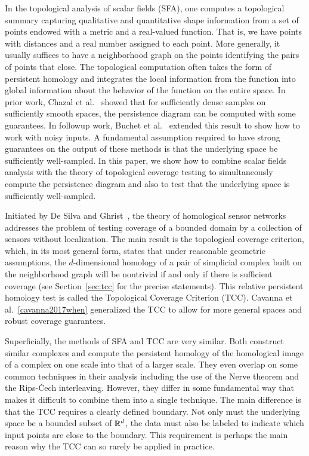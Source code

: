
In the topological analysis of scalar fields (SFA), one computes a topological summary capturing qualitative and quantitative shape information from a set of points endowed with a metric and a real-valued function.
That is, we have points with distances and a real number assigned to each point.
More generally, it usually suffices to have a neighborhood graph on the points identifying the pairs of points that close.
The topological computation often takes the form of persistent homology and integrates the local information from the function into global information about the behavior of the function on the entire space.
In prior work, Chazal et al.~\cite{XXX} showed that for sufficiently dense samples on sufficiently smooth spaces, the persistence diagram can be computed with some guarantees.
In followup work, Buchet et al.~\cite{XXX} extended this result to show how to work with noisy inputs.
A fundamental assumption required to have strong guarantees on the output of these methods is that the underlying space be sufficiently well-sampled.
In this paper, we show how to combine scalar fields analysis with the theory of topological coverage testing to simultaneously compute the persistence diagram and also to test that the underlying space is sufficiently well-sampled.

Initiated by De Silva and Ghrist~\cite{XXX,XXX,XXX}, the theory of homological sensor networks addresses the problem of testing coverage of a bounded domain by a collection of sensors without localization.
The main result is the topological coverage criterion, which, in its most general form, states that under reasonable geometric assumptions, the $d$-dimensional homology of a pair of simplicial complex built on the neighborhood graph will be nontrivial if and only if there is sufficient coverage (see Section~\ref{sec:tcc} for the precise statements).
This relative persistent homology test is called the Topological Coverage Criterion (TCC).
Cavanna et al.~\ref{cavanna2017when} generalized the TCC to allow for more general spaces and robust coverage guarantees.

Superficially, the methods of SFA and TCC are very similar.
Both construct similar complexes and compute the persistent homology of the homological image of a complex on one scale into that of a larger scale.
They even overlap on some common techniques in their analysis including the use of the Nerve theorem and the Rips-\v{C}ech interleaving.
However, they differ in some fundamental way that makes it difficult to combine them into a single technique.
The main difference is that the TCC requires a clearly defined boundary.
Not only must the underlying space be a bounded subset of $\mathbb{R}^d$, the data must also be labeled to indicate which input points are close to the boundary.
This requirement is perhaps the main reason why the TCC can so rarely be applied in practice.

